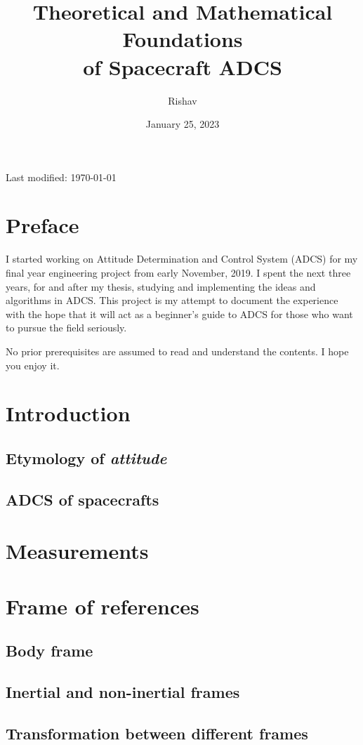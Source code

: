 \documentclass{article}
\title{Theoretical and Mathematical Foundations\\of Spacecraft ADCS}
\author{Rishav}
\date{January 25, 2023}
\begin{document}
\maketitle
Last modified: \today

\newpage
\section*{Preface}
I started working on Attitude Determination and Control System (ADCS) for my final year engineering project from early November, 2019. I spent the next three years, for and after my thesis, studying and implementing the ideas and algorithms in ADCS. This project is my attempt to document the experience with the hope that it will act as a beginner's guide to ADCS for those who want to pursue the field seriously.

No prior prerequisites are assumed to read and understand the contents. I hope you enjoy it.

\newpage
\tableofcontents

\newpage
\section{Introduction}
\subsection{Etymology of \textit{attitude}}
\subsection{ADCS of spacecrafts}

\section{Measurements}

\section{Frame of references}
\subsection{Body frame}
\subsection{Inertial and non-inertial frames}
\subsection{Transformation between different frames}
\end{document}
